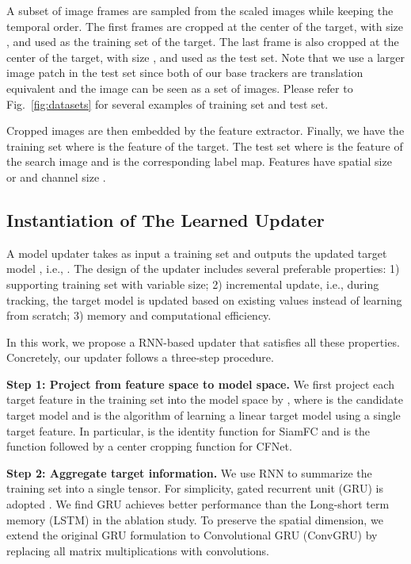 \documentclass[journal]{IEEEtran}
\begin{document}
A subset of  image frames are sampled from the scaled images while keeping the temporal order. The first  frames are cropped at the center of the target, with size , and used as the training set of the target. The last frame is also cropped at the center of the target, with size , and used as the test set. Note that we use a larger image patch in the test set since both of our base trackers are translation equivalent and the  image can be seen as a set of  images. Please refer to Fig.~\ref{fig:datasets} for several examples of training set and test set.

Cropped images are then embedded by the feature extractor. Finally, we have the training set  where  is the feature of the target. The test set  where  is the feature of the search image and  is the corresponding label map.
Features have spatial size  or  and channel size .

\subsection{Instantiation of The Learned Updater}
A model updater takes as input a training set  and outputs the updated target model , i.e., . The design of the updater includes several preferable properties: 1) supporting training set with variable size; 2) incremental update, i.e., during tracking, the target model is updated based on existing values instead of learning from scratch; 3) memory and computational efficiency.

In this work, we propose a RNN-based updater that satisfies all these properties. Concretely, our updater follows a three-step procedure.

\textbf{Step 1: Project from feature space to model space.} We first project each target feature in the training set into the model space by , 
where  is the candidate target model and  is the algorithm of learning a linear target model using a single target feature. In particular,  is the identity function for SiamFC and is the  function followed by a center cropping function for CFNet.

\textbf{Step 2: Aggregate target information.} We use RNN to summarize the training set into a single tensor. For simplicity, gated recurrent unit (GRU) is adopted \cite{cho2014learning}. We find GRU achieves better performance than the Long-short term memory (LSTM\cite{hochreiter1997long}) in the ablation study. To preserve the spatial dimension, we extend the original GRU formulation to Convolutional GRU (ConvGRU) by replacing all matrix multiplications with convolutions.
\end{document}
